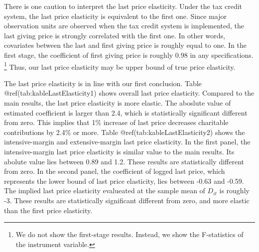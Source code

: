 \documentclass[
]{article}
\begin{document}
\color{blue}

There is one caution to interpret the last price elasticity.
Under the tax credit system, the last price elasticity is equivalent to the first one.
Since major observation units are observed when the tax credit system is implemented,
the last giving price is strongly correlated with the first one.
In other words, covariates between the last and first giving price is roughly equal to one.
In the first stage, the coefficient of first giving price is roughly 0.98 in any specifications. \footnote{We do not show the first-stage results. Instead, we show the F-statistics of the instrument variable.}
Thus, our last price elasticity may be upper bound of true price elasticity.

\color{black}

The last price elasticity is in line with our first conclusion.
Table @ref(tab:kableLastElasticity1) shows overall last price elasticity.
Compared to the main results, the last price elasticity is more elastic.
The aboslute value of estimated coefficient is larger than 2.4,
which is statistically significant different from zero.
This implies that 1\% increase of last price decreases charitable contributions by 2.4\% or more.
Table @ref(tab:kableLastElasticity2) shows the intensive-margin and extensive-margin last price elasticity.
In the first panel,
the intensive-margin last price elasticity is similar value to the main results.
Its abolute value lies between 0.89 and 1.2.
These results are statistically different from zero.
In the second panel,
the coefficient of logged last price, which represents the lower bound of last price elasticity,
lies between -0.63 and -0.59.
The implied last price elasticity evalueated at the sample mean of \(D_{it}\) is roughly -3.
These results are statistically significant different from zero,
and more elastic than the first price elasticity.
\end{document}
